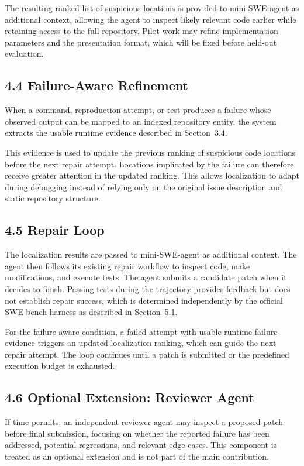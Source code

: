 \documentclass[11pt]{article}
\begin{document}
The resulting ranked list of suspicious locations is provided to mini-SWE-agent
as additional context, allowing the agent to inspect likely relevant code
earlier while retaining access to the full repository. Pilot work may refine implementation parameters and the presentation
format, which will be fixed before held-out evaluation.


\subsection*{4.4 Failure-Aware Refinement}

When a command, reproduction attempt, or test produces a failure whose
observed output can be mapped to an indexed repository entity, the system
extracts the usable runtime evidence described in Section~3.4.

This evidence is used to update the previous ranking of suspicious code
locations before the next repair attempt. Locations implicated by the failure
can therefore receive greater attention in the updated ranking. This allows
localization to adapt during debugging instead of relying only on the original
issue description and static repository structure.


\subsection*{4.5 Repair Loop}

The localization results are passed to mini-SWE-agent as additional context.
The agent then follows its existing repair workflow to inspect code, make
modifications, and execute tests. The agent submits a candidate patch when it decides to finish.
Passing tests during the trajectory provides feedback but does not
establish repair success, which is determined independently by the
official SWE-bench harness as described in Section~5.1.

For the failure-aware condition, a failed attempt with usable runtime failure
evidence triggers an updated localization ranking, which can guide the next
repair attempt. The loop continues until a patch is submitted or the predefined
execution budget is exhausted.


\subsection*{4.6 Optional Extension: Reviewer Agent}

If time permits, an independent reviewer agent may inspect a proposed patch
before final submission, focusing on whether the reported failure has been
addressed, potential regressions, and relevant edge cases. This component is
treated as an optional extension and is not part of the main contribution.
\end{document}
